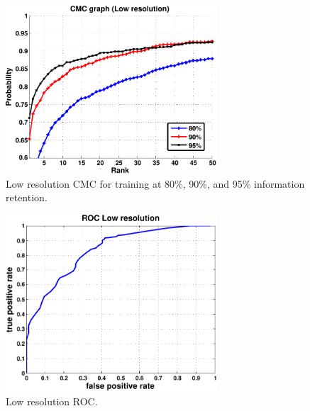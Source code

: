 ~\vfill

\vfill

~\vfill

\begin{figure}[hbt]
  \centering
  \includegraphics[width=0.7\textwidth]{../results/Output_L.pdf}
  \caption{Low resolution CMC for training at 80\%, 90\%, and 95\% information retention.}
  \label{fig:cfc_l}
\end{figure}

\begin{figure}[hbt]
  \centering
  \includegraphics[width=0.7\textwidth]{../results/ROC_L.pdf}
  \caption{Low resolution ROC.}
  \label{fig:roc_l}
\end{figure}

\clearpage

~\vfill

